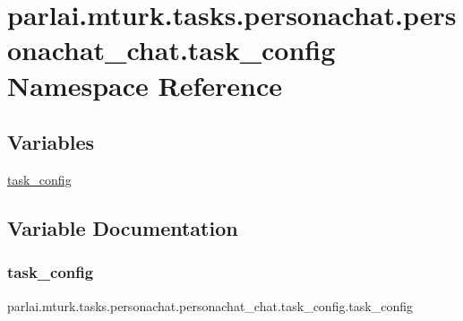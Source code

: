 \hypertarget{namespaceparlai_1_1mturk_1_1tasks_1_1personachat_1_1personachat__chat_1_1task__config}{}\section{parlai.\+mturk.\+tasks.\+personachat.\+personachat\+\_\+chat.\+task\+\_\+config Namespace Reference}
\label{namespaceparlai_1_1mturk_1_1tasks_1_1personachat_1_1personachat__chat_1_1task__config}
\subsection*{Variables}
\begin{DoxyCompactItemize}
\item 
\hyperlink{namespaceparlai_1_1mturk_1_1tasks_1_1personachat_1_1personachat__chat_1_1task__config_a36ade59983bbab74df35e3d22bac11de}{task\+\_\+config}
\end{DoxyCompactItemize}


\subsection{Variable Documentation}
\mbox{\label{namespaceparlai_1_1mturk_1_1tasks_1_1personachat_1_1personachat__chat_1_1task__config_a36ade59983bbab74df35e3d22bac11de}} 
\subsubsection{\texorpdfstring{task\+\_\+config}{task\_config}}
{\footnotesize\ttfamily parlai.\+mturk.\+tasks.\+personachat.\+personachat\+\_\+chat.\+task\+\_\+config.\+task\+\_\+config}

